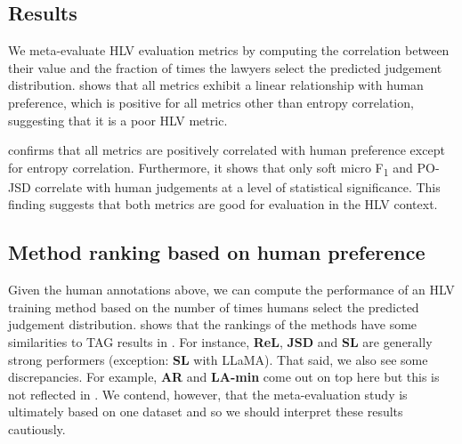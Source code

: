 \documentclass[shortpaper]{clv2025}
\newcommand{\pojsd}{PO-JSD\xspace}
\newcommand{\methname}[1]{\textbf{#1}}  %
\begin{document}
\subsection{Results}

We meta-evaluate HLV evaluation metrics by computing the correlation between
their value and the fraction of times the lawyers select the predicted judgement
distribution.  shows that all metrics exhibit a
linear relationship with human preference, which is positive for all metrics
other than entropy correlation, suggesting that it is a poor HLV metric.

 confirms that all metrics are positively
correlated with human preference except for entropy
correlation. Furthermore, it shows that only soft micro
F\textsubscript{1} and \pojsd correlate with human judgements at a
level of statistical significance. This finding suggests that both
metrics are good for evaluation in the HLV context.

\subsection{Method ranking based on human preference}

Given the human annotations above, we can compute the performance of an HLV
training method based on the number of times humans select the predicted
judgement distribution.  shows that the rankings
of the methods have some similarities to TAG results in
.
For instance, \methname{ReL}, \methname{JSD} and \methname{SL} are generally
strong performers (exception:  \methname{SL} with LLaMA). That said, we also see
some discrepancies. For example, \methname{AR} and \methname{LA-min} come out on
top here but this is not reflected in
.
We contend, however, that the meta-evaluation study is ultimately based on one
dataset and so we should interpret these results cautiously.
\end{document}
